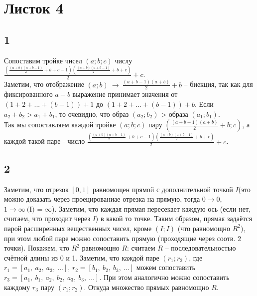 \newpage
	\section{Листок 4}
		\subsection{1}
		Сопоставим тройке чисел $(a;b;c)$ числу $\frac{(\frac{(a+b)(a+b-1)}{2} + b + c - 1)(\frac{(a+b)(a+b-1)}{2} + b + c)}{2} + c$.\\
		Заметим, что отображение $(a;b) \: \to \: \frac{(a+b-1)(a+b)}{2} + b$ --  биекция, так как для фиксированного $a+b$ выражение принимает значения от $(1 + 2 + ... + (b - 1)) + 1$ до $(1 + 2 + ... + (b - 1)) + b$. Если $a_2+b_2 > a_1+b_1$, то очевидно, что образ $(a_2;b_2)$ > образа $(a_1;b_1)$.\\
		Так мы сопоставляем каждой тройке $(a;b;c)$ пару $(\frac{(a+b-1)(a+b)}{2} + b;c)$, а каждой такой паре - число $\frac{(\frac{(a+b)(a+b-1)}{2} + b + c - 1)(\frac{(a+b)(a+b-1)}{2} + b + c)}{2} + c$.
		
		\subsection{2}
		Заметим, что отрезок $[0,1]$ равномощен прямой с дополнительной точкой $I$(это можно доказать через проецированиае отрезка на прямую, тогда $0 \to 0$, $1 \to \infty \ \text{(I) = $\infty$}$). Заметим, что каждая прямая пересекает каждую ось (если нет, считаем, что проходит через $I$) в какой то точке. Таким образом, прямая задаётся парой расширенных вещественных чисел, кроме $(I;I)$ (что равномощно $R^2$), при этом любой паре можно сопоставить прямую (проходящие через соотв. 2 точки). Покажем, что $R^2$ равномощно $R$: считаем $R$ -- последовательностью счётной длины из 0 и 1. Заметим, что каждой паре $(r_1;r_2)$, где $r_1 = [a_1,\: a_2,\: a_3,\: ...]$, $r_2 = [b_1,\: b_2,\: b_3,\: ...]$ можем сопоставить $r_3 = [a_1,\: b_1,\: a_2,\: b_2,\: a_3,\: b_3,\: ...]$. При этом аналогично можно сопоставить каждому $r_3$ пару $(r_1;r_2)$.
		Откуда множество прямых равномощно $R$.
		
